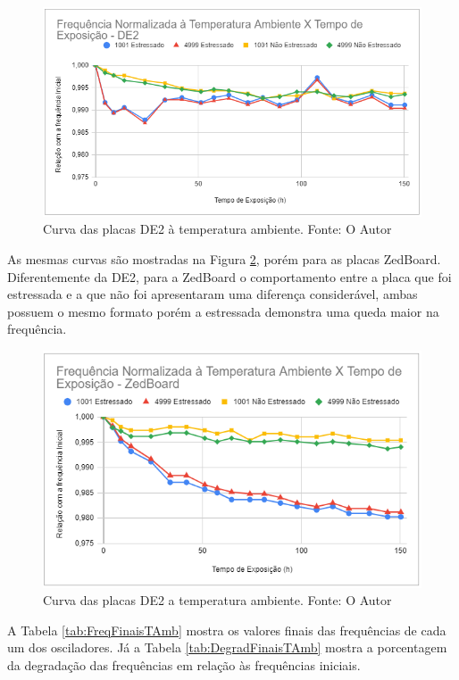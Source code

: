 \begin{figure}[H]
    \centering
    \includegraphics[scale=0.75]{figures/Resultados/TAmbDE2}
    \caption{Curva das placas DE2 à temperatura ambiente. Fonte: O Autor}
    \label{fig:TAmbDE2}
\end{figure}

As mesmas curvas são mostradas na Figura \ref{fig:TAmbZedBoard}, porém para as placas ZedBoard. Diferentemente da DE2, para a ZedBoard o comportamento entre a placa que foi estressada e a que não foi apresentaram uma diferença considerável, ambas possuem o mesmo formato porém a estressada demonstra uma queda maior na frequência.

\begin{figure}[H]
    \centering
    \includegraphics[scale=0.75]{figures/Resultados/TAmbZedBoard}
    \caption{Curva das placas DE2 a temperatura ambiente. Fonte: O Autor}
    \label{fig:TAmbZedBoard}
\end{figure}

A Tabela \ref{tab:FreqFinaisTAmb} mostra os valores finais das frequências de cada um dos osciladores. Já a Tabela \ref{tab:DegradFinaisTAmb} mostra a porcentagem da degradação das frequências em relação às frequências iniciais.

